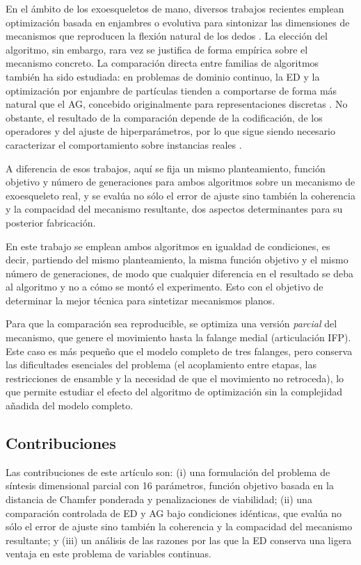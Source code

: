 En el ámbito de los exoesqueletos de mano, diversos trabajos recientes emplean
optimización basada en enjambres o evolutiva para sintonizar las dimensiones de
mecanismos que reproducen la flexión natural de los dedos
\cite{ref_exo_review,ref_exo_stephenson}. La elección del algoritmo, sin
embargo, rara vez se justifica de forma empírica sobre el mecanismo concreto. La
comparación directa entre familias de algoritmos también ha sido estudiada: en
problemas de dominio continuo, la ED y la optimización por enjambre de partículas
tienden a comportarse de forma más natural que el AG, concebido originalmente
para representaciones discretas \cite{ref_ga_pso_de,ref_de_vs_ga}. No obstante,
el resultado de la comparación depende de la codificación, de los operadores y
del ajuste de hiperparámetros, por lo que sigue siendo necesario caracterizar el
comportamiento sobre instancias reales \cite{ref_de_survey,ref_de_sade}.

A diferencia de esos trabajos, aquí se fija un mismo planteamiento, función
objetivo y número de generaciones para ambos algoritmos sobre un mecanismo de
exoesqueleto real, y se evalúa no sólo el error de ajuste sino también la
coherencia y la compacidad del mecanismo resultante, dos aspectos determinantes
para su posterior fabricación.

En este trabajo se emplean ambos algoritmos en igualdad de condiciones, es decir,
partiendo del mismo planteamiento, la misma función objetivo y el mismo número de
generaciones, de modo que cualquier diferencia en el resultado se deba al
algoritmo y no a cómo se montó el experimento. Esto con el objetivo de determinar
la mejor técnica para sintetizar mecanismos planos.

Para que la comparación sea reproducible, se optimiza una versión \emph{parcial}
del mecanismo, que genere el movimiento hasta la falange medial (articulación
IFP). Este caso es más pequeño que el modelo completo de tres falanges, pero
conserva las dificultades esenciales del problema (el acoplamiento entre etapas,
las restricciones de ensamble y la necesidad de que el movimiento no retroceda),
lo que permite estudiar el efecto del algoritmo de optimización sin
la complejidad añadida del modelo completo.

\subsection{Contribuciones}
Las contribuciones de este artículo son: (i) una formulación del
problema de síntesis dimensional parcial con 16 parámetros, función objetivo
basada en la distancia de Chamfer ponderada y penalizaciones de viabilidad;
(ii) una comparación controlada de ED y AG bajo condiciones idénticas, que
evalúa no sólo el error de ajuste sino también la coherencia y la compacidad del
mecanismo resultante; y (iii) un análisis de las razones por las que la ED
conserva una ligera ventaja en este problema de variables continuas.
